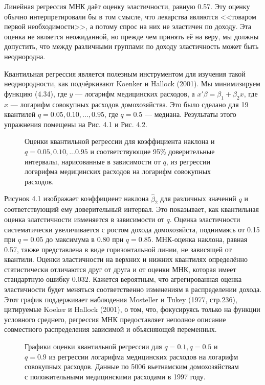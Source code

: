 Линейная регрессия МНК даёт оценку эластичности, равную 0.57. Эту оценку обычно интерпретировали бы в том смысле, что лекарства являются <<товаром первой необходимости>>, а потому спрос на них не эластичен по доходу. Эта оценка не является неожиданной, но прежде чем принять её на веру, мы должны допустить, что между различными группами по доходу эластичность может быть неоднородна.

Квантильная регрессия является полезным инструментом для изучения такой неоднородности, как подчёркивают Koenker и Hallock (2001). Мы минимизируем функцию (4.34), где $y$ --- логарифм медицинских расходов, а $x'\beta = \beta_1 +\beta_2 x$, где $x$ --- логарифм совокупных расходов домохозяйства. Это было сделано для 19 квантилей $q = {0.05, 0.10,..., 0.95}$, где $q = 0.5$ --- медиана. Результаты этого упражнения помещены на Рис. 4.1 и Рис. 4.2. 
\begin{figure}[t]
 \caption{Оценки квантильной регрессии для коэффициента наклона и $q = 0.05,0.10,...0.95$ и соответствующие 95\% доверительные интервалы, нарисованные в зависимости от $q$, из регрессии логарифма медицинских расходов на логарифм совокупных расходов.}
\end{figure}
Рисунок 4.1 изображает коэффициент наклона $\hat{\beta}_2$ для различных значений $q$ и соответствующий ему доверительный интервал. Это показывает, как квантильная оценка элатстичности изменяется в зависимости от $q$. Оценка эластичности систематически увеличивается с ростом дохода домохозяйста, поднимаясь от 0.15 при $q=0.05$ до максимума в $0.80$ при $q=0.85$. МНК-оценка наклона, равная 0.57, также представлена в виде горизонтальной линии, не зависящей от квантили. Оценки эластичности на верхних и нижних квантилях определённо статистически отличаются друг от друга и от оценки МНК, которая имеет стандартную ошибку 0.032. Кажется вероятным, что агрегированная оценка эластичности будет меняться соответственно изменениям в распределении дохода. Этот график поддерживает наблюдения Mosteller и Tukey (1977, стр.236), цитируемые Koeker и Hallock (2001), о том, что, фокусируясь только на функции условного среднего, регрессия МНК предоставляет неполное описание совместного распределения зависимой и объясняющей переменных.

\begin{figure}[t]
 \caption{Графики оценки квантильной регрессии для $q=0.1, q=0.5$ и $q=0.9$ из регрессии логарифма медицинских расходов на логарифм совокупных расходов. Данные по 5006 вьетнамским домохозяйствам с положительными медицинскими расходами в 1997 году.}
\end{figure}

